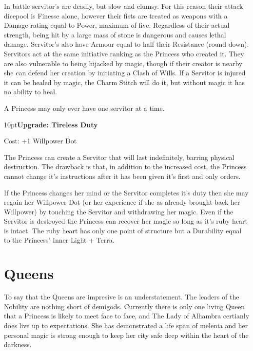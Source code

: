 In battle servitor's are deadly, but slow and clumsy. For this reason their attack dicepool is Finesse alone, however their fists are treated as weapons with a Damage rating equal to Power, maximum of five. Regardless of their actual strength, being hit by a large mass of stone is dangerous and causes lethal damage. Servitor's also have Armour equal to half their Resistance (round down). Servitors act at the same initiative ranking as the Princess who created it. They are also vulnerable to being hijacked by magic, though if their creator is nearby she can defend her creation by initiating a Clash of Wills. If a Servitor is injured it can be healed by magic, the Charm Stitch will do it, but without magic it has no ability to heal.

A Princess may only ever have one servitor at a time.

\begin{myindentpar}{10pt}\textbf{Upgrade: Tireless Duty}

Cost: +1 Willpower Dot

The Princess can create a Servitor that will last indefinitely, barring physical destruction. The drawback is that, in addition to the increased cost, the Princess cannot change it's instructions after it has been given it's first and only orders.

If the Princess changes her mind or the Servitor completes it's duty then she may regain her Willpower Dot (or her experience if she as already brought back her Willpower) by touching the Servitor and withdrawing her magic. Even if the Servitor is destroyed the Princess can recover her magic so long as it's ruby heart is intact. The ruby heart has only one point of structure but a Durability equal to the Princess' Inner Light + Terra. \end{myindentpar}




\section*{Queens}

To say that the Queens are impresive is an understatement. The leaders of the Nobility are nothing short of demigods. Currently there is only one living Queen that a Princess is likely to meet face to face, and The Lady of Alhambra certianly does live up to expectations. She has demonstrated a life span of melenia and her personal magic is strong enough to keep her city safe deep within the heart of the darkness. 

